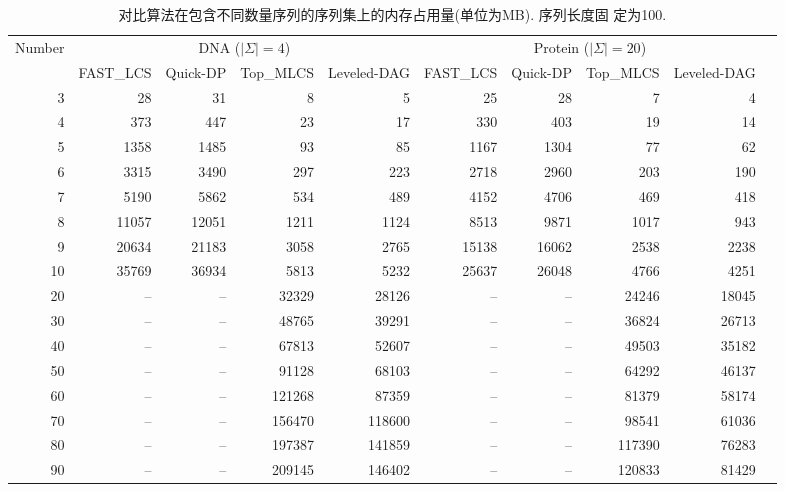 \documentclass[utf8]{frontiersSCNS} %
\begin{document}
\begin{table*}[htp]
  \footnotesize
  \caption{对比算法在包含不同数量序列的序列集上的内存占用量(单位为MB). 序列长度固
    定为100.}
  \label{tab:memory1}
 \begin{tabular}{|r|r|r|r|r|r|r|r|r|r|}
   \hline
   Number &
   \multicolumn{4}{c|}{DNA ($|\Sigma|=4$)} & \multicolumn{4}{c|}{Protein ($|\Sigma|=20$)}\\
   \cline{2-9}
     & FAST\_LCS & Quick-DP & Top\_MLCS & Leveled-DAG & FAST\_LCS & Quick-DP & Top\_MLCS & Leveled-DAG \\
   \hline
   3  & 28      & 31      &  8        & 5      & 25     & 28    & 7      & 4   \\
   4  & 373     & 447     &  23       & 17     & 330    & 403   & 19     & 14  \\
   5  & 1358    & 1485    &  93       & 85     & 1167   & 1304  & 77     & 62  \\
   6  & 3315    & 3490    &  297      & 223    & 2718   & 2960  & 203    & 190 \\
   7  & 5190    & 5862    &  534      & 489    & 4152   & 4706  & 469    & 418 \\
   8  & 11057   & 12051   &  1211     & 1124   & 8513   & 9871  & 1017   & 943 \\
   9  & 20634   & 21183   &  3058     & 2765   & 15138  & 16062 & 2538   & 2238\\

   10 & 35769   & 36934   &  5813     & 5232   & 25637  & 26048 & 4766   & 4251  \\
   20 & --      & --      &  32329    & 28126  &  --    &  --   & 24246  & 18045 \\
   30 & --      & --      &  48765    & 39291  &  --    &  --   & 36824  & 26713  \\
   40 & --      & --      &  67813    & 52607  &  --    &  --   & 49503  & 35182  \\
   50 & --      & --      &  91128    & 68103  &  --    &  --   & 64292  & 46137  \\
   60 & --      & --      &  121268   & 87359  &  --    &  --   & 81379  & 58174  \\
   70 & --      & --      &  156470   & 118600 &  --    &  --   & 98541  & 61036  \\
   80 & --      & --      &  197387   & 141859 &  --    &  --   & 117390 & 76283  \\
   90 & --      & --      &  209145   & 146402 &  --    &  --   & 120833 & 81429  \\



\end{tabular}
\end{table*}
\end{document}
